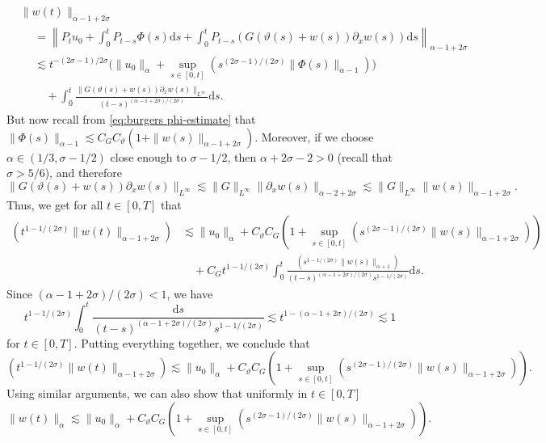 \documentclass[a4paper,11pt]{article}
\newcommand{\mathd}{\mathrm{d}}
\theoremstyle{remark}
\begin{document}
\begin{align*}
   &\| w ( t ) \|_{\alpha -1+2 \sigma} \\
   &\hspace{15pt} = \left\| P_{t} u_{0} + \int_{0}^{t} P_{t-s} \Phi ( s ) \mathd s+ \int_{0}^{t} P_{t-s} ( G ( \vartheta ( s ) +w ( s ) ) \partial_{x} w ( s ) ) \mathd s \right\|_{\alpha -1+2 \sigma} \\
   &\hspace{15pt} \lesssim t^{- ( 2 \sigma -1 ) /2 \sigma} \Big( \| u_{0} \|_{\alpha} + \sup_{s \in [ 0,t ]} ( s^{( 2 \sigma -1 ) / ( 2 \sigma )} \| \Phi ( s )\|_{\alpha -1} ) \Big) \\
   &\hspace{15pt} \quad + \int_{0}^{t} \frac{\| G ( \vartheta ( s ) +w ( s ) ) \partial_{x} w ( s ) \|_{L^{\infty}}}{( t-s )^{( \alpha -1+2 \sigma ) / ( 2 \sigma )}} \mathd s.
\end{align*}
But
now recall from {\eqref{eq:burgers phi-estimate}} that $\| \Phi ( s )\|_{\alpha -1} \lesssim C_{G} C_{\vartheta} ( 1+ \| w ( s ) \|_{\alpha -1+2 \sigma} )$. Moreover, if we choose $\alpha \in ( 1/3, \sigma -1/2 )$ close enough to $\sigma -1/2$, then $\alpha +2 \sigma -2>0$ (recall that $\sigma >5/6$), and therefore
\[
   \| G ( \vartheta ( s ) +w ( s ) ) \partial_{x} w ( s ) \|_{L^{\infty}} \lesssim \| G \|_{L^{\infty}} \| \partial_{x} w ( s ) \|_{\alpha -2+2 \sigma} \lesssim \| G \|_{L^{\infty}} \| w ( s ) \|_{\alpha -1+2 \sigma} .
\]
Thus, we get for all $t \in [ 0,T ]$ that
\begin{align*}
   ( t^{1-1/ ( 2 \sigma )} \| w ( t ) \|_{\alpha -1+2 \sigma} ) & \lesssim  \| u_{0} \|_{\alpha} + C_{\vartheta} C_{G} ( 1+ \sup_{s \in [ 0,t ]} ( s^{( 2 \sigma -1 ) / ( 2 \sigma )} \| w ( s ) \|_{\alpha -1+2 \sigma} ) ) \\
   &\quad + C_{G} t^{1-1/ ( 2 \sigma )} \int_{0}^{t} \frac{( s^{1-1/ ( 2 \sigma )} \| w ( s ) \|_{\alpha +1} )}{( t-s )^{( \alpha -1+2 \sigma ) / ( 2 \sigma )} s^{1-1/ ( 2 \sigma )}} \mathd s.
\end{align*}
Since $( \alpha -1+2 \sigma ) / ( 2 \sigma ) <1$, we have
\[
   t^{1-1/ ( 2 \sigma )} \int_{0}^{t} \frac{\mathd s}{( t-s )^{( \alpha -1+2 \sigma ) / ( 2 \sigma )} s^{1-1/ ( 2 \sigma )}} \lesssim t^{1- ( \alpha -1+2 \sigma ) / ( 2 \sigma )} \lesssim 1
\]
for $t \in [ 0,T ]$. Putting everything together, we conclude that
\begin{equation}\label{eq:burgers unscaled w estimate}
   ( t^{1-1/ ( 2 \sigma )} \| w ( t ) \|_{\alpha -1+2 \sigma} ) \lesssim \| u_{0} \|_{\alpha} + C_{\vartheta} C_{G} ( 1+ \sup_{s \in [ 0,t ]} ( s^{( 2 \sigma -1 ) / ( 2 \sigma )} \| w ( s ) \|_{\alpha -1+2 \sigma} ) ) .
\end{equation}
Using similar arguments, we can also show that uniformly in $t \in [0,T]$
\begin{equation}\label{eq:burgers unscaled w alpha estimate}
   \| w ( t ) \|_{\alpha} \lesssim \| u_{0} \|_{\alpha} + C_{\vartheta} C_{G} ( 1+ \sup_{s \in [ 0,t ]} ( s^{( 2 \sigma -1 ) / ( 2 \sigma )} \| w ( s ) \|_{\alpha -1+2 \sigma} ) ) .
\end{equation}
\end{document}
